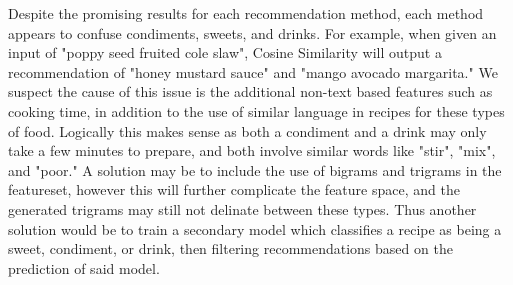 \documentclass[sigconf]{acmart}
\begin{document}
Despite the promising results for each recommendation method, each method appears to confuse condiments, sweets, and drinks. For example, when given an input of "poppy seed fruited cole slaw", Cosine Similarity will output a recommendation of "honey mustard sauce" and "mango avocado margarita." We suspect the cause of this issue is the additional non-text based features such as cooking time, in addition to the use of similar language in recipes for these types of food. Logically this makes sense as both a condiment and a drink may only take a few minutes to prepare, and both involve similar words like "stir", "mix", and "poor." A solution may be to include the use of bigrams and trigrams in the featureset, however this will further complicate the feature space, and the generated trigrams may still not delinate between these types. Thus another solution would be to train a secondary model which classifies a recipe as being a sweet, condiment, or drink, then filtering recommendations based on the prediction of said model.
\end{document}
